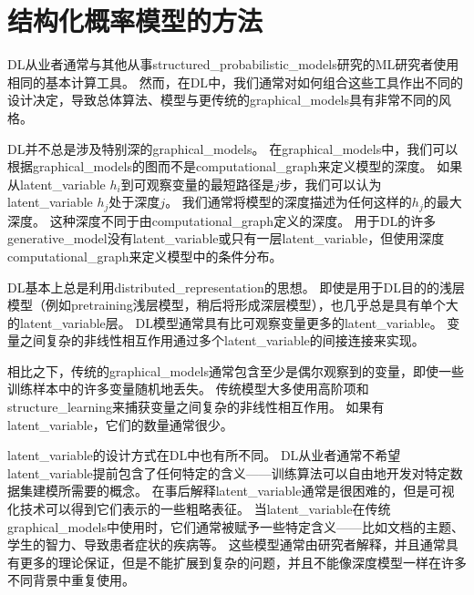 \section{结构化概率模型的方法}
\label{sec:the_deep_learning_approach_to_structured_probabilistic_models}

\gls{DL}从业者通常与其他从事\gls{structured_probabilistic_models}研究的\gls{ML}研究者使用相同的基本计算工具。
然而，在\gls{DL}中，我们通常对如何组合这些工具作出不同的设计决定，导致总体算法、模型与更传统的\gls{graphical_models}具有非常不同的风格。


\gls{DL}并不总是涉及特别深的\gls{graphical_models}。
在\gls{graphical_models}中，我们可以根据\gls{graphical_models}的图而不是\gls{computational_graph}来定义模型的深度。
如果从\gls{latent_variable} $h_i$到可观察变量的最短路径是$j$步，我们可以认为\gls{latent_variable} $h_j$处于深度$j$。
我们通常将模型的深度描述为任何这样的$h_j$的最大深度。 
这种深度不同于由\gls{computational_graph}定义的深度。
用于\gls{DL}的许多\gls{generative_model}没有\gls{latent_variable}或只有一层\gls{latent_variable}，但使用深度\gls{computational_graph}来定义模型中的条件分布。


\gls{DL}基本上总是利用\gls{distributed_representation}的思想。
即使是用于\gls{DL}目的的浅层模型（例如\gls{pretraining}浅层模型，稍后将形成深层模型），也几乎总是具有单个大的\gls{latent_variable}层。
\gls{DL}模型通常具有比可观察变量更多的\gls{latent_variable}。
变量之间复杂的非线性相互作用通过多个\gls{latent_variable}的间接连接来实现。


相比之下，传统的\gls{graphical_models}通常包含至少是偶尔观察到的变量，即使一些训练样本中的许多变量随机地丢失。
传统模型大多使用高阶项和\gls{structure_learning}来捕获变量之间复杂的非线性相互作用。
如果有\gls{latent_variable}，它们的数量通常很少。



\gls{latent_variable}的设计方式在\gls{DL}中也有所不同。
\gls{DL}从业者通常不希望\gls{latent_variable}提前包含了任何特定的含义——训练算法可以自由地开发对特定数据集建模所需要的概念。
在事后解释\gls{latent_variable}通常是很困难的，但是可视化技术可以得到它们表示的一些粗略表征。
当\gls{latent_variable}在传统\gls{graphical_models}中使用时，它们通常被赋予一些特定含义——比如文档的主题、学生的智力、导致患者症状的疾病等。
这些模型通常由研究者解释，并且通常具有更多的理论保证，但是不能扩展到复杂的问题，并且不能像深度模型一样在许多不同背景中重复使用。


